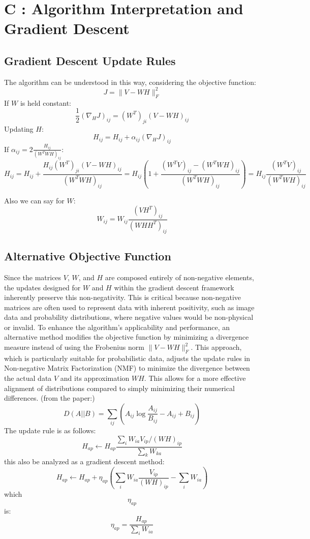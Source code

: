 \documentclass[journal,12pt,onecolumn,draftclsnofoot]{IEEEtran}
\begin{document}
\section*{C : Algorithm Interpretation and Gradient Descent}

\subsection*{Gradient Descent Update Rules}
The algorithm can be understood in this way, considering the objective function:
\[
J = \|V - WH\|^2_F
\]
If \(W\) is held constant:
\[
\frac{1}{2} (\nabla_H J)_{ij} = (W^T)_{ji} (V - WH)_{ij}
\]
Updating \(H\):
\[
H_{ij} = H_{ij} + \alpha_{ij} (\nabla_H J)_{ij}
\]
If \(\alpha_{ij} = 2 \frac{H_{ij}}{(W^T WH)_{ij}}\):
\[
H_{ij} = H_{ij} + \frac{H_{ij} (W^T)_{ji} (V - WH)_{ij}}{(W^T WH)_{ij}} = H_{ij} \left( 1 + \frac{(W^T V)_{ij} - (W^T WH)_{ij}}{(W^T WH)_{ij}} \right) = H_{ij} \frac{(W^T V)_{ij}}{(W^T WH)_{ij}}
\]

Also we can say for \(W\):
\[
W_{ij} = W_{ij} \frac{(VH^T)_{ij}}{(WHH^T)_{ij}}
\]

\subsection*{Alternative Objective Function}
Since the matrices \(V\), \(W\), and \(H\) are composed entirely of non-negative elements, the updates designed for \(W\) and \(H\) within the gradient descent framework inherently preserve this non-negativity. This is critical because non-negative matrices are often used to represent data with inherent positivity, such as image data and probability distributions, where negative values would be non-physical or invalid.
To enhance the algorithm's applicability and performance, an alternative method modifies the objective function by minimizing a divergence measure instead of using the Frobenius norm \( \|V - WH\|_F^2 \). This approach, which is particularly suitable for probabilistic data, adjusts the update rules in Non-negative Matrix Factorization (NMF) to minimize the divergence between the actual data \( V \) and its approximation \( WH \). This allows for a more effective alignment of distributions compared to simply minimizing their numerical differences. (from the paper:)
\[
D(A||B) = \sum_{ij} \left( A_{ij} \log \frac{A_{ij}}{B_{ij}} - A_{ij} + B_{ij} \right)
\]
The update rule is as follows:
\[
H_{ap} \leftarrow H_{ap} \frac{\sum_i W_{ia} V_{ip} / (WH)_{ip}}{\sum_k W_{ka}}
\]
this also be analyzed as a gradient descent method:
\[
H_{ap} \leftarrow H_{ap} + \eta_{ap} \left( \sum_i W_{ia} \frac{V_{ip}}{(WH)_{ip}} - \sum_i W_{ia} \right)
\]
which \[\eta_{ap}\] is:
\[
\eta_{ap} = \frac{H_{ap}}{\sum_i W_{ia}}
\]
\end{document}
